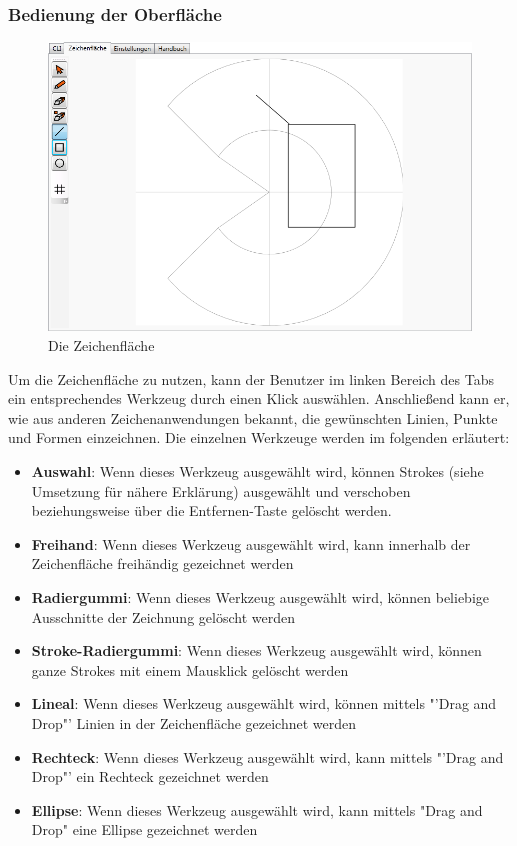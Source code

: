 \subsubsection{Bedienung der Oberfläche}

\begin{figure}[H]
  \centering
  \begin{minipage}[t]{12 cm}
  	\centering
  	\includegraphics[width=12cm]{images/DrawingArea} 
    \caption{Die Zeichenfläche}
  \end{minipage}
\end{figure}

Um die Zeichenfläche zu nutzen, kann der Benutzer im linken Bereich des Tabs ein entsprechendes Werkzeug durch einen Klick auswählen. Anschließend kann er, wie aus anderen Zeichenanwendungen bekannt, die gewünschten Linien, Punkte und Formen einzeichnen. Die einzelnen Werkzeuge werden im folgenden erläutert:
\begin{itemize}
\item \textbf{Auswahl}: Wenn dieses Werkzeug ausgewählt wird, können Strokes (siehe Umsetzung für nähere Erklärung) ausgewählt und verschoben beziehungsweise über die Entfernen-Taste gelöscht werden.
\item \textbf{Freihand}: Wenn dieses Werkzeug ausgewählt wird, kann innerhalb der Zeichenfläche freihändig gezeichnet werden
\item \textbf{Radiergummi}: Wenn dieses Werkzeug ausgewählt wird, können beliebige Ausschnitte der Zeichnung gelöscht werden
\item \textbf{Stroke-Radiergummi}: Wenn dieses Werkzeug ausgewählt wird, können ganze Strokes mit einem Mausklick gelöscht werden
\item \textbf{Lineal}: Wenn dieses Werkzeug ausgewählt wird, können mittels "'Drag and Drop"' Linien in der Zeichenfläche gezeichnet werden
\item \textbf{Rechteck}: Wenn dieses Werkzeug ausgewählt wird, kann mittels "'Drag and Drop"' ein Rechteck gezeichnet werden
\item \textbf{Ellipse}: Wenn dieses Werkzeug ausgewählt wird, kann mittels "Drag and Drop" eine Ellipse gezeichnet werden
\end{itemize}

